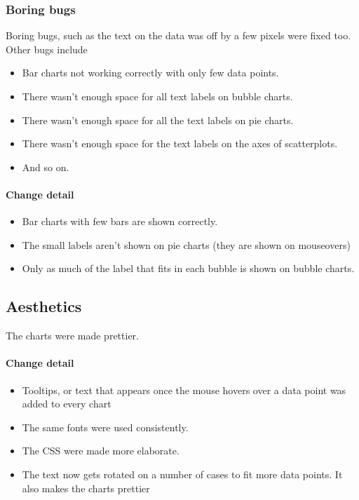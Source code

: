   \subsubsection{Boring bugs}
  Boring bugs, such as the text on the data was off by a few pixels were fixed too.
  Other bugs include 
  \begin{itemize}
  	\item Bar charts not working correctly with only few data points.
  	\item There wasn't enough space for all text labels on bubble charts.
  	\item There wasn't enough space for all the text labels on pie charts.
  	\item There wasn't enough space for the text labels on the axes of scatterplots.
  	\item And so on.
  \end{itemize}
  
  \paragraph{Change detail}
  \begin{itemize}
  	\item Bar charts with few bars are shown correctly. 
  	\item The small labels aren't shown on pie charts (they are shown on mouseovers)
  	\item Only as much of the label that fits in each bubble is shown on bubble charts.
\end{itemize}
  


\subsection{Aesthetics}
The charts were made prettier.
  
\paragraph{Change detail}
\begin{itemize}
  \item Tooltips, or text that appears once the mouse hovers over a data point was added to every chart
  \item The same fonts were used consistently.
  \item The CSS were made more elaborate.
  \item The text now gets rotated on a number of cases to fit more data points. It also makes the charts prettier

\end{itemize}
  

